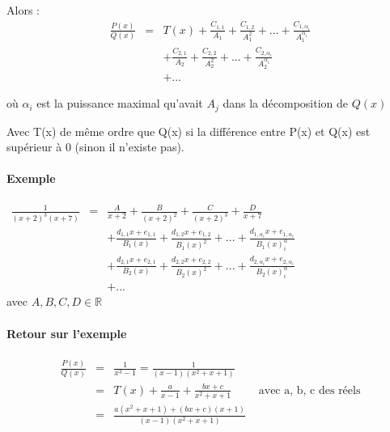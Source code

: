 	Alors : 
	\[\begin{array}{rcl}
			\frac{P(x)}{Q(x)} &=& T(x) + \frac{C_{1,1}}{A_1} + \frac{C_{1,2}}{A_1^2} + ... + \frac{C_{1,\alpha_i}}{A_1^{\alpha_i}} \\
								&& +\frac{C_{2,1}}{A_2} + \frac{C_{2,2}}{A_2^2} + ... + \frac{C_{2,\alpha_i}}{A_2^{\alpha_i}}  \\
			&& + ...
	\end{array}\]

	où $\alpha_i$ est la puissance maximal qu'avait $A_j$ dans la décomposition de $Q(x)$

	Avec T(x) de même ordre que Q(x) si la différence entre P(x) et Q(x) est supérieur à 0 (sinon il n'existe pas).

	\paragraph{Exemple}
	
	$\begin{array}{rcl}
		\frac{1}{(x+2)^3 (x+7)} &=& \frac{A}{x+2} + \frac{B}{(x+2)^2} + \frac{C}{(x+2)^3} + \frac{D}{x+7} \\
		&& + \frac{d_{1,1}x + e_{1,1}}{B_1(x)} +\frac{d_{1,2}x + e_{1,2}}{B_1(x)^2}  + ... + \frac{d_{1,\alpha_i}x + e_{1,\alpha_i}}{B_1(x)^\alpha_i} \\
		&& + \frac{d_{2,1}x + e_{2,1}}{B_2(x)} +\frac{d_{2,2}x + e_{2,2}}{B_2(x)^2}  + ... + \frac{d_{2,\alpha_i}x + e_{2,\alpha_i}}{B_2(x)^\alpha_i} \\
		&& +...
	\end{array}$ ~\\
	avec $A, B, C, D \in \mathbb{R}$

	\paragraph{Retour sur l'exemple}

	\[\begin{array}{rclr}
			\frac{P(x)}{Q(x)} &=& \frac{1}{x^3 -1} = \frac{1}{(x-1)(x^2 + x + 1)} \\
						   &=& T(x) + \frac{a}{x-1} + \frac{bx+c}{x^2 + x + 1} & \text{ avec a, b, c des réels} \\
						   &=& \frac{a(x^2 + x + 1) + (bx+c)(x+1)}{(x-1)(x^2 + x + 1)} \end{array}\]

